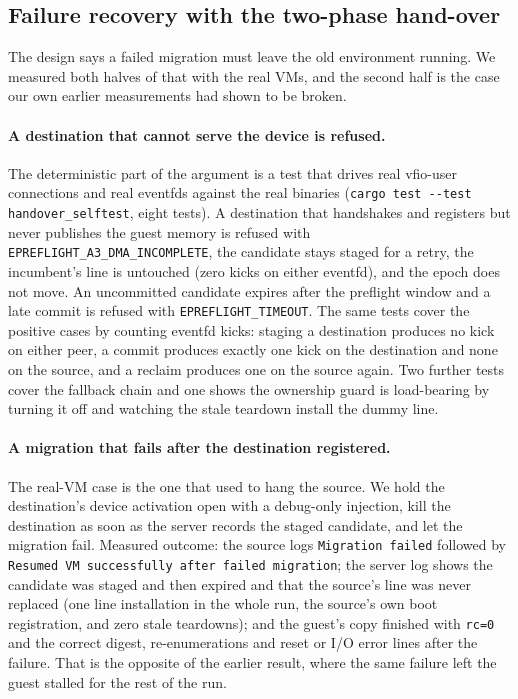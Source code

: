 \documentclass[10pt,conference]{IEEEtran}
\newcommand{\code}[1]{\texttt{#1}}
\begin{document}
\subsection{Failure recovery with the two-phase hand-over}
\label{sec:recovery}
The design says a failed migration must leave the old environment running. We
measured both halves of that with the real VMs, and the second half is the case
our own earlier measurements had shown to be broken.

\paragraph{A destination that cannot serve the device is refused.}
The deterministic part of the argument is a test that drives real vfio-user
connections and real eventfds against the real binaries
(\code{cargo test -{}-test handover\_selftest}, eight tests). A destination that
handshakes and registers but never publishes the guest memory is refused with
\code{EPREFLIGHT\_A3\_DMA\_INCOMPLETE}, the candidate stays staged for a retry,
the incumbent's line is untouched (zero kicks on either eventfd), and the epoch
does not move. An uncommitted candidate expires after the preflight window and a
late commit is refused with \code{EPREFLIGHT\_TIMEOUT}. The same tests cover the
positive cases by counting eventfd kicks: staging a destination produces no kick
on either peer, a commit produces exactly one kick on the destination and none on
the source, and a reclaim produces one on the source again. Two further tests
cover the fallback chain and one shows the ownership guard is load-bearing by
turning it off and watching the stale teardown install the dummy line.

\paragraph{A migration that fails after the destination registered.}
The real-VM case is the one that used to hang the source. We hold the
destination's device activation open with a debug-only injection, kill the
destination as soon as the server records the staged candidate, and let the
migration fail. Measured outcome: the source logs
\code{Migration failed} followed by \code{Resumed VM successfully after failed
migration}; the server log shows the candidate was staged and then expired and
that the source's line was never replaced (one line installation in the whole
run, the source's own boot registration, and zero stale teardowns); and the
guest's copy finished with \code{rc=0} and the correct digest,
\ReclaimEnumerations{} re-enumerations and \ReclaimErrors{} reset or I/O error
lines after the failure. That is the opposite of the earlier result, where the
same failure left the guest stalled for the rest of the run.
\end{document}
